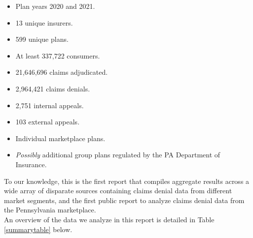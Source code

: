 \documentclass[12pt, a4paper,twoside]{report}
\theoremstyle{plain} %
\theoremstyle{definition} %
\theoremstyle{remark} %
\numberwithin{equation}{chapter}
\begin{document}
\begin{itemize}
\begin{tcolorbox}
			\begin{itemize}
				\item Plan years 2020 and 2021.
				\item 13 unique insurers.
				\item 599 unique plans.
				\item At least 337,722 consumers.
				\item 21,646,696 claims adjudicated.
				\item 2,964,421 claims denials.
				\item 2,751 internal appeals.
				\item 103 external appeals.
				\item Individual marketplace plans.
				\item \emph{Possibly} additional group plans regulated by the PA Department of Insurance.
			\end{itemize}
		\end{tcolorbox}
	
	
	
		\end{itemize}
	
		
		To our knowledge, this is the first report that compiles aggregate results across a wide array of disparate sources containing claims denial data from different market segments, and the first public report to analyze claims denial data from the Pennsylvania marketplace.\\
		
		An overview of the data we analyze in this report is detailed in Table \ref{summarytable} below.
		\clearpage
		
\end{document}
